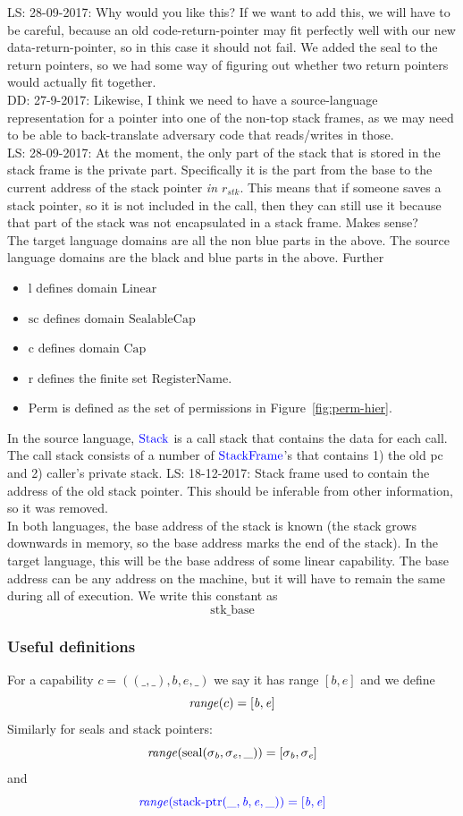 \documentclass[a3paper]{article}
\newcommand\lau[1]{{\color{purple} \sf \footnotesize {LS: #1}}\\}
\newcommand\dominique[1]{{\color{purple} \sf \footnotesize {DD: #1}}\\}
\newcommand{\sourcecolor}{\color{blue}}
\newcommand{\src}[1]{{\sourcecolor #1}}
\newcommand{\shareddom}[1]{\mathrm{#1}}
\newcommand{\RegName}{\shareddom{RegisterName}}
\newcommand{\Perm}{\shareddom{Perm}}
\newcommand{\Caps}{\shareddom{Cap}}
\newcommand{\SealableCaps}{\shareddom{SealableCap}}
\newcommand{\Linear}{\shareddom{Linear}}
\newcommand{\StkFrame}{\shareddom{StackFrame}}
\newcommand{\Stack}{\shareddom{Stack}}
\newcommand{\scbnf}{\shareddom{sc}}
\newcommand{\cbnf}{\shareddom{c}}
\newcommand{\rbnf}{\shareddom{r}}
\newcommand{\linbnf}{\shareddom{l}}
\newcommand{\stkptr}[1]{\mathrm{stack\text{-}ptr}(#1)}
\newcommand{\seal}[1]{\shareddom{seal}(#1)}
\newcommand{\var}[1]{\mathit{#1}}
\newcommand{\stk}{\var{stk}}
\newcommand{\baddr}{\var{b}}
\newcommand{\eaddr}{\var{e}}
\newcommand{\constant}[1]{\mathrm{#1}}
\newcommand{\stkb}{\constant{stk\_base}}
\newcommand{\plainfun}[2]{
  \ifthenelse{\equal{#2}{}}
  {\mathit{#1}}
  {\mathit{#1}(#2)}
}
\newcommand{\range}[1]{\plainfun{range}{#1}}
\begin{document}
\lau{28-09-2017: Why would you like this? If we want to add this, we will have to be careful, because an old code-return-pointer may fit perfectly well with our new data-return-pointer, so in this case it should not fail. We added the seal to the return pointers, so we had some way of figuring out whether two return pointers would actually fit together.}
\dominique{27-9-2017: Likewise, I think we need to have a source-language representation for a pointer into one of the non-top stack frames, as we may need to be able to back-translate adversary code that reads/writes in those.}
\lau{28-09-2017: At the moment, the only part of the stack that is stored in the stack frame is the private part. Specifically it is the part from the base to the current address of the stack pointer \emph{in $r_\stk$}. This means that if someone saves a stack pointer, so it is not included in the call, then they can still use it because that part of the stack was not encapsulated in a stack frame. Makes sense?}
The target language domains are all the non blue parts in the above. The source language domains are the black and blue parts in the above. Further
\begin{itemize}
\item $\linbnf$ defines domain $\Linear$
\item $\scbnf$ defines domain $\SealableCaps$
\item $\cbnf$ defines domain $\Caps$
\item $\rbnf$ defines the finite set $\RegName$. 
\item $\Perm$ is defined as the set of permissions in Figure~\ref{fig:perm-hier}.
\end{itemize}

In the source language, $\src{\Stack}$ is a call stack that contains the data for each call. The call stack consists of a number of $\src{\StkFrame}$'s that contains 1) the old pc and 2) caller's private stack.
\lau{18-12-2017: Stack frame used to contain the address of the old stack pointer. This should be inferable from other information, so it was removed.}

 In both languages, the base address of the stack is known (the stack grows downwards in memory, so the base address marks the end of the stack). In the target language, this will be the base address of some linear capability. The base address can be any address on the machine, but it will have to remain the same during all of execution. We write this constant as
\[
  \stkb
\]


\subsubsection{Useful definitions}
\begin{definition}
  For a capability $c=((\_,\_),\baddr,\eaddr,\_)$ we say it has range $[\baddr,\eaddr]$ and we define
  \[
    \range{c} = [\baddr,\eaddr]
  \]
  Similarly for seals and stack pointers:
  \[
    \range{\seal{\sigma_\baddr,\sigma_\eaddr,\_}} = [\sigma_\baddr,\sigma_\eaddr]
  \]
  and
  \[
    \src{\range{\stkptr{\_,\baddr,\eaddr,\_}} = [\baddr,\eaddr]}
  \]
\end{definition}
\end{document}
